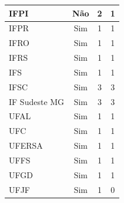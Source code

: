 \begin{table}[]
{\begin{tabular}{|l|c|c|c|}
IFPI                                                               & Não                  & 2                               & 1                          \\ \hline
IFPR                                                               & Sim                  & 1                               & 1                          \\ \hline
IFRO                                                               & Sim                  & 1                               & 1                          \\ \hline
IFRS                                                               & Sim                  & 1                               & 1                          \\ \hline
IFS                                                                & Sim                  & 1                               & 1                          \\ \hline
IFSC                                                               & Sim                  & 3                               & 3                          \\ \hline
IF Sudeste MG                                                      & Sim                  & 3                               & 3                          \\ \hline
UFAL                                                               & Sim                  & 1                               & 1                          \\ \hline
UFC                                                                & Sim                  & 1                               & 1                          \\ \hline
UFERSA                                                             & Sim                  & 1                               & 1                          \\ \hline
UFFS                                                               & Sim                  & 1                               & 1                          \\ \hline
UFGD                                                               & Sim                  & 1                               & 1                          \\ \hline
UFJF                                                               & Sim                  & 1                               & 0                          \\ \hline

\end{tabular}}
\end{table}
